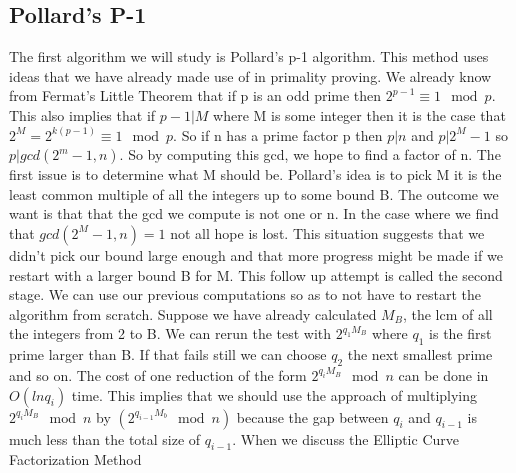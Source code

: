 \documentclass{article}
\begin{document}
\subsection{Pollard's P-1}
The first algorithm we will study is Pollard's p-1 algorithm. This method uses ideas that we have already made use of in primality proving. We already know from Fermat's Little Theorem that if p is an odd prime then $2^{p-1} \equiv 1 \mod p$. This also implies that if $p - 1 | M$ where M is some integer then it is the case that $2^M = 2^{k ( p-1 ) }  \equiv 1 \mod p$. So if n has a prime factor p then $p | n$ and $ p | 2^M - 1 $ so $ p | gcd ( 2^m - 1, n)$. So by computing this gcd, we hope to find a factor of n. The first issue is to determine what M should be. Pollard's idea is to pick M it is the least common multiple of all the integers up to some bound B. The outcome we want is that that the gcd we compute is not one or n. In the case where we find that $gcd(2^M - 1, n) = 1$ not all hope is lost. This situation suggests that we didn't pick our bound large enough and that more progress might be made if we restart with a larger bound B for M.  This follow up attempt is called the second stage. We can use our previous computations so as to not have to restart the algorithm from scratch. Suppose we have already calculated $M_B$, the lcm of all the integers from 2 to B. We can rerun the test with $2^{q_1 M_B}$ where $q_1$ is the first prime larger than B. If that fails still we can choose $q_2$ the next smallest prime and so on. The cost of one reduction of the form $2^{q_i M_B} \mod n$ can be done in $O(ln q_i)$ time. This implies that we should use the approach of multiplying $2^{q_i M_B} \mod n $ by $(2^{q_{i-1} M_b} \mod n)$ because the gap between $q_i$ and $q_{i-1}$ is  much less than the total size of $q_{i-1}$.  When we discuss the Elliptic Curve Factorization Method 
\end{document}
